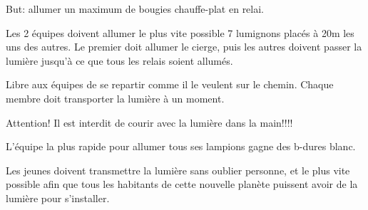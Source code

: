 \documentclass{grand-jeu}
\begin{document}
\begin{liste-materiel}
\end{liste-materiel}

\begin{regles}
But: allumer un maximum de bougies chauffe-plat en relai.

Les 2 équipes doivent allumer le plus vite possible 7 lumignons placés à 20m les uns des autres.
Le premier doit allumer le cierge, puis les autres doivent passer la lumière jusqu'à ce que tous les relais soient allumés.

Libre aux équipes de se repartir comme il le veulent sur le chemin. Chaque membre doit transporter la lumière à un moment. 

Attention! Il est interdit de courir avec la lumière dans la main!!!!

L'équipe la plus rapide pour allumer tous ses lampions gagne des b-dures blanc. 
\end{regles}

\begin{imaginaire}
Les jeunes doivent transmettre la lumière sans oublier personne, et le plus vite possible afin que tous les habitants de cette nouvelle planète puissent avoir de la lumière pour s'installer.
\end{imaginaire}

\begin{moments-stop}
\end{moments-stop}
\end{document}
